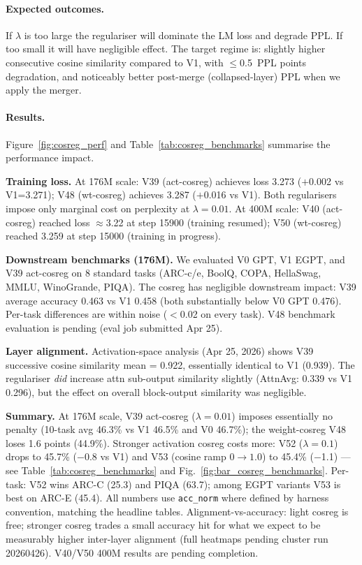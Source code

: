 \paragraph{Expected outcomes.}
If $\lambda$ is too large the regulariser will dominate the LM loss and degrade PPL.
If too small it will have negligible effect.  The target regime is: slightly higher
consecutive cosine similarity compared to V1, with $\leq$0.5~PPL points degradation,
and noticeably better post-merge (collapsed-layer) PPL when we apply the merger.

\paragraph{Results.}
Figure~\ref{fig:cosreg_perf} and Table~\ref{tab:cosreg_benchmarks} summarise
the performance impact.

\textbf{Training loss.}
At 176M scale: V39 (act-cosreg) achieves loss 3.273 ($+$0.002 vs V1=3.271); V48 (wt-cosreg)
achieves 3.287 ($+$0.016 vs V1).  Both regularisers impose only marginal cost on perplexity
at $\lambda{=}0.01$.  At 400M scale: V40 (act-cosreg) reached loss $\approx$3.22 at step 15900
(training resumed); V50 (wt-cosreg) reached 3.259 at step 15000 (training in progress).

\textbf{Downstream benchmarks (176M).}
We evaluated V0 GPT, V1 EGPT, and V39 act-cosreg on 8 standard tasks (ARC-c/e, BoolQ, COPA,
HellaSwag, MMLU, WinoGrande, PIQA).
The cosreg has negligible downstream impact: V39 average accuracy 0.463 vs V1 0.458
(both substantially below V0 GPT 0.476).
Per-task differences are within noise ($<$0.02 on every task).
V48 benchmark evaluation is pending (eval job submitted Apr 25).

\textbf{Layer alignment.}
Activation-space analysis (Apr 25, 2026) shows V39 successive
cosine similarity mean = 0.922, essentially identical to V1 (0.939).
The regulariser \emph{did} increase attn sub-output similarity slightly (AttnAvg:
0.339 vs V1 0.296), but the effect on overall block-output similarity was negligible.

\textbf{Summary.}
At 176M scale, V39 act-cosreg ($\lambda{=}0.01$) imposes essentially no
penalty (10-task avg 46.3\% vs V1 46.5\% and V0 46.7\%); the weight-cosreg
V48 loses 1.6 points (44.9\%). Stronger activation cosreg costs more:
V52 ($\lambda{=}0.1$) drops to 45.7\% ($-$0.8 vs V1) and V53 (cosine ramp
$0{\to}1.0$) to 45.4\% ($-$1.1) — see Table~\ref{tab:cosreg_benchmarks} and
Fig.~\ref{fig:bar_cosreg_benchmarks}. Per-task: V52 wins ARC-C (25.3) and
PIQA (63.7); among EGPT variants V53 is best on ARC-E (45.4). All numbers
use \texttt{acc\_norm} where defined by harness convention, matching the
headline tables.
Alignment-vs-accuracy: light cosreg is free; stronger cosreg trades a small
accuracy hit for what we expect to be measurably higher inter-layer alignment
(full heatmaps pending cluster run 20260426). V40/V50 400M results are
pending completion.

